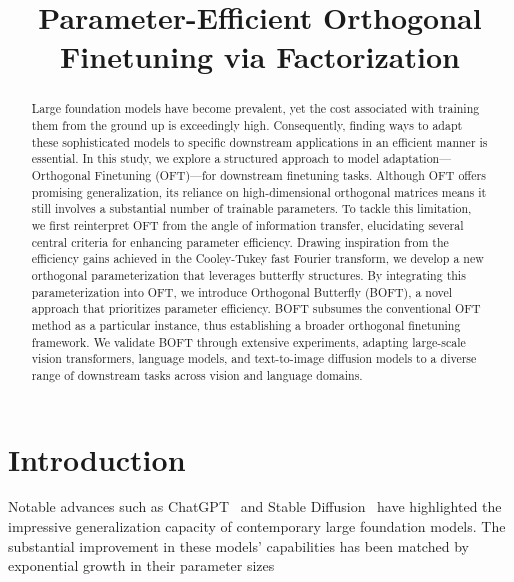 \title{Parameter-Efficient Orthogonal Finetuning via Factorization}

\begin{abstract}
Large foundation models have become prevalent, yet the cost associated with training them from the ground up is exceedingly high. Consequently, finding ways to adapt these sophisticated models to specific downstream applications in an efficient manner is essential. In this study, we explore a structured approach to model adaptation—Orthogonal Finetuning (OFT)—for downstream finetuning tasks. Although OFT offers promising generalization, its reliance on high-dimensional orthogonal matrices means it still involves a substantial number of trainable parameters. To tackle this limitation, we first reinterpret OFT from the angle of information transfer, elucidating several central criteria for enhancing parameter efficiency. Drawing inspiration from the efficiency gains achieved in the Cooley-Tukey fast Fourier transform, we develop a new orthogonal parameterization that leverages butterfly structures. By integrating this parameterization into OFT, we introduce Orthogonal Butterfly (BOFT), a novel approach that prioritizes parameter efficiency. BOFT subsumes the conventional OFT method as a particular instance, thus establishing a broader orthogonal finetuning framework. We validate BOFT through extensive experiments, adapting large-scale vision transformers, language models, and text-to-image diffusion models to a diverse range of downstream tasks across vision and language domains.
\end{abstract}

\section{Introduction}

Notable advances such as ChatGPT~\cite{brown2020language,chen2021evaluating} and Stable Diffusion~\cite{rombach2022high} have highlighted the impressive generalization capacity of contemporary large foundation models. The substantial improvement in these models’ capabilities has been matched by exponential growth in their parameter sizes

